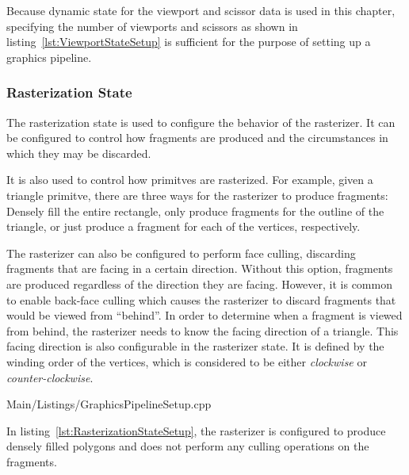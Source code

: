         Because dynamic state for the viewport and scissor data is used in this chapter, specifying the number of viewports and scissors as shown in listing~\ref{lst:ViewportStateSetup} is sufficient for the purpose of setting up a graphics pipeline.

      \subsubsection{Rasterization State}
        The rasterization state is used to configure the behavior of the rasterizer.
        It can be configured to control how fragments are produced and the circumstances in which they may be discarded.

        It is also used to control how primitves are rasterized.
        For example, given a triangle primitve, there are three ways for the rasterizer to produce fragments: Densely fill the entire rectangle, only produce fragments for the outline of the triangle, or just produce a fragment for each of the vertices, respectively.

        The rasterizer can also be configured to perform face culling, discarding fragments that are facing in a certain direction.
        Without this option, fragments are produced regardless of the direction they are facing.
        However, it is common to enable back-face culling which causes the rasterizer to discard fragments that would be viewed from ``behind''.
        In order to determine when a fragment is viewed from behind, the rasterizer needs to know the facing direction of a triangle.
        This facing direction is also configurable in the rasterizer state.
        It is defined by the winding order of the vertices, which is considered to be either \textit{clockwise} or \textit{counter-clockwise}.

        
        {Main/Listings/GraphicsPipelineSetup.cpp}


        In listing~\ref{lst:RasterizationStateSetup}, the rasterizer is configured to produce densely filled polygons and does not perform any culling operations on the fragments.

